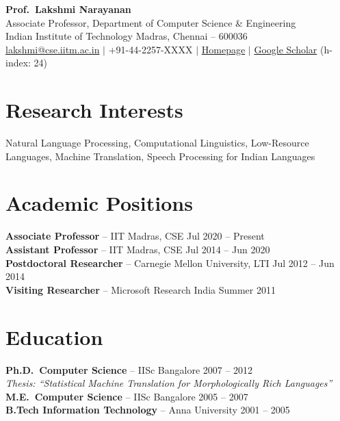 \documentclass[11pt,letterpaper]{article}
\begin{document}
\begin{center}
{\Large\bfseries Prof.\ Lakshmi Narayanan}\\[4pt]
{\small Associate Professor, Department of Computer Science \& Engineering}\\
{\small Indian Institute of Technology Madras, Chennai -- 600036}\\[4pt]
{\footnotesize \href{mailto:lakshmi@cse.iitm.ac.in}{lakshmi@cse.iitm.ac.in} \quad $\vert$ \quad +91-44-2257-XXXX \quad $\vert$ \quad \href{https://www.cse.iitm.ac.in/~lakshmi}{Homepage} \quad $\vert$ \quad \href{https://scholar.google.com}{Google Scholar} (h-index: 24)}
\end{center}

\section{Research Interests}
Natural Language Processing, Computational Linguistics, Low-Resource Languages, Machine Translation, Speech Processing for Indian Languages

\section{Academic Positions}
\textbf{Associate Professor} -- IIT Madras, CSE \hfill Jul 2020 -- Present\\
\textbf{Assistant Professor} -- IIT Madras, CSE \hfill Jul 2014 -- Jun 2020\\
\textbf{Postdoctoral Researcher} -- Carnegie Mellon University, LTI \hfill Jul 2012 -- Jun 2014\\
\textbf{Visiting Researcher} -- Microsoft Research India \hfill Summer 2011

\section{Education}
\textbf{Ph.D.\ Computer Science} -- IISc Bangalore \hfill 2007 -- 2012\\
\textit{Thesis: ``Statistical Machine Translation for Morphologically Rich Languages''}\\[3pt]
\textbf{M.E.\ Computer Science} -- IISc Bangalore \hfill 2005 -- 2007\\
\textbf{B.Tech Information Technology} -- Anna University \hfill 2001 -- 2005
\end{document}
